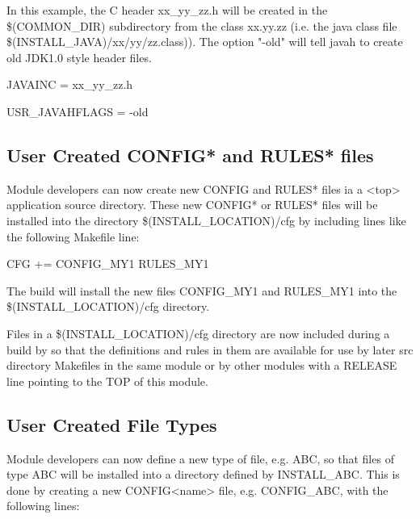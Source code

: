 In this example, the C header xx\_yy\_zz.h will be created in the \$(COMMON\_DIR) subdirectory from the class xx.yy.zz 
(i.e. the java class file \$(INSTALL\_JAVA)/xx/yy/zz.class)). The option "-old" will tell javah to create old JDK1.0 style 
header files.

\begin{description}\item JAVAINC = xx\_yy\_zz.h

\item USR\_JAVAHFLAGS = -old

\end{description}\subsection{User Created CONFIG* and RULES* files}

Module developers can now create new CONFIG and RULES* files ia a \textless{}top\textgreater{} application source directory. These new 
CONFIG* or RULES* files will be installed into the directory \$(INSTALL\_LOCATION)/cfg by including lines like the 
following Makefile line:

\begin{description}\item       {}CFG += CONFIG\_MY1 RULES\_MY1

\end{description}The build will install the new files CONFIG\_MY1 and RULES\_MY1 into the \$(INSTALL\_LOCATION)/cfg directory.

Files in a \$(INSTALL\_LOCATION)/cfg directory are now included during a build by so that the definitions and rules in 
them are available for use by later src directory Makefiles in the same module or by other modules with a RELEASE line 
pointing to the TOP of this module.

\subsection{User Created File Types}

Module developers can now define a new type of file, e.g. ABC, so that files of type ABC will be installed into a directory 
defined by INSTALL\_ABC. This is done by creating a new CONFIG\textless{}name\textgreater{} file, e.g. CONFIG\_ABC, with the 
following lines:

